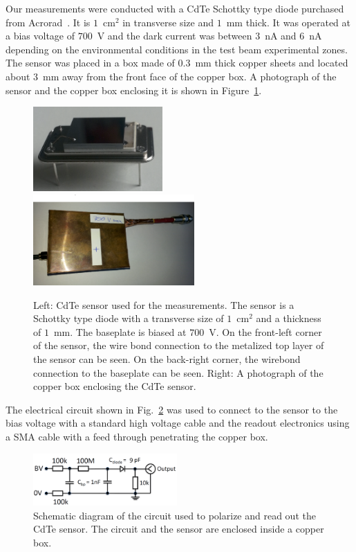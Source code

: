 %
Our measurements were conducted with a CdTe Schottky type diode purchased from 
Acrorad~\cite{acrorad}. It is $1$~$\mathrm{cm}^{2}$ in transverse size and $1$~mm thick.
It was operated at a bias voltage of $700$~V and the dark current was between $3$~nA 
and $6$~nA depending on the environmental conditions in the test beam experimental 
zones. The sensor was placed in a box made of $0.3$~mm thick copper sheets and located
about $3$~mm away from the front face of the copper box.
A photograph of the sensor and the copper box enclosing it is shown in 
Figure~\ref{fig:CdTeSensor}.

%
\begin{figure}[htbp] 
\centering
\includegraphics[width=0.44\textwidth]{figures/CdTeSensor.png} 
\includegraphics[width=0.55\textwidth]{figures/CdTeSensorBox.png} 
\caption{Left: CdTe sensor used for the measurements. The sensor is a Schottky type diode with a transverse size 
of $1$~$\mathrm{cm}^{2}$ and a thickness of $1$~mm. The baseplate is biased at $700$~V. 
On the front-left corner of the sensor, the wire bond connection
to the metalized top layer of the sensor can be seen. On the back-right corner,
the wirebond connection to the baseplate can be seen. 
Right: A photograph of the copper box enclosing the CdTe sensor. } 
\label{fig:CdTeSensor} 
\end{figure} 
%
The electrical circuit shown in Fig.~\ref{fig:cdtecircuit} was used to connect to the sensor to the bias 
voltage with a standard high voltage cable and the readout electronics using a SMA cable with a feed 
through penetrating the copper box.

%
\begin{figure}[htbp] 
\centering
\includegraphics[width=0.49\textwidth]{figures/circuit_CdTe.png} 
\caption{Schematic diagram of the circuit used to polarize and read out the 
CdTe sensor. The circuit and the sensor are enclosed inside a copper box. }
\label{fig:cdtecircuit} 
\end{figure} 
%
